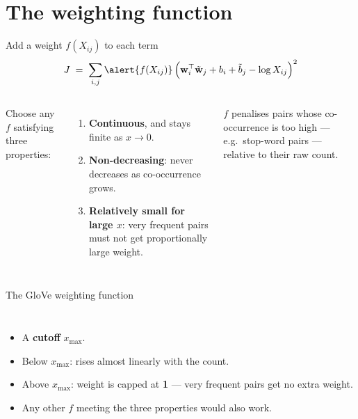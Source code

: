 \documentclass[aspectratio=169,11pt]{beamer}
\newcommand{\wv}{\mathbf{w}}
\newcommand{\cv}{\tilde{\mathbf{w}}}
\begin{document}
\section{The weighting function}

\begin{frame}{Add a weight $f(X_{ij})$ to each term}
\[
  J \;=\; \sum_{i,j} \alert{f(X_{ij})}\,
      \Bigl( \wv_i^\top \cv_j + b_i + \tilde b_j - \log X_{ij} \Bigr)^2
\]
\begin{columns}[T]
Choose any $f$ satisfying three properties:
\begin{enumerate}
  \item \textbf{Continuous}, and stays finite as $x \to 0$.
  \item \textbf{Non-decreasing}: never decreases as co-occurrence grows.
  \item \textbf{Relatively small for large $x$}: very frequent pairs must
        not get proportionally large weight.
\end{enumerate}
\small
$f$ penalises pairs whose co-occurrence is too high --- e.g.\ stop-word
pairs --- relative to their raw count.
\end{columns}
\end{frame}

\begin{frame}{The GloVe weighting function}
\begin{columns}[c]
\centering
{}
\begin{itemize}
  \item A \textbf{cutoff} $x_{\max}$.
  \item Below $x_{\max}$: rises almost linearly with the count.
  \item Above $x_{\max}$: weight is capped at \textbf{1} --- very frequent
        pairs get no extra weight.
  \item Any other $f$ meeting the three properties would also work.
\end{itemize}
\end{columns}
\end{frame}
\end{document}

